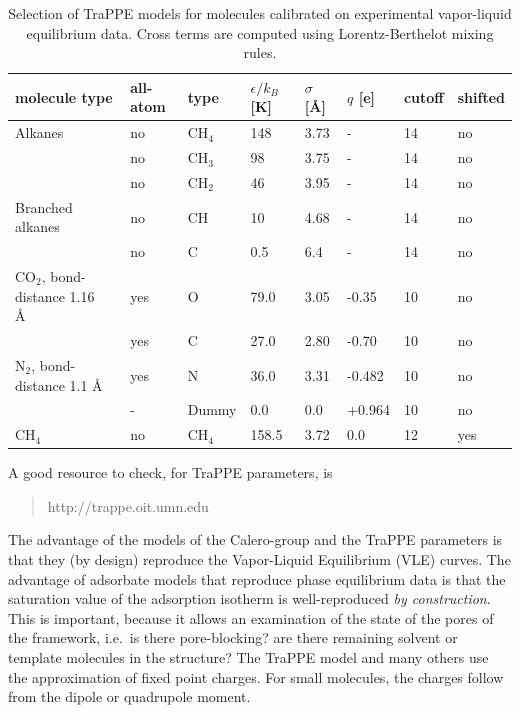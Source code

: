 \begin{table}[H]
\begin{tabular}{p{5.5cm}|p{1.5cm}|p{1.3cm}|p{1.3cm}|p{1.0cm}|p{1.15cm}|p{1.0cm}|p{1.0cm}}
molecule type &  all-atom & type & $\epsilon/k_B$ [K] & $\sigma$ [\AA] & $q$ [e] & cutoff & shifted\\
\hline
\hline
Alkanes \cite{Martin1998} & no  & CH$_4$ & 148 & 3.73 & - & 14 & no\\
                         & no  & CH$_3$ & 98 & 3.75 & - & 14 & no\\
                         & no  & CH$_2$ & 46 & 3.95 & - & 14 & no\\
\hline
Branched alkanes\cite {Martin1999} & no  & CH & 10 & 4.68 & - & 14 & no\\
                                  & no  & C & 0.5 & 6.4 & - & 14 & no\\
\hline
CO$_2$, bond-distance 1.16 \AA\ \cite{Potoff2001} & yes  & O     & 79.0 & 3.05 & -0.35 & 10 & no\\
                                                   & yes  & C     & 27.0 & 2.80 & -0.70 & 10 & no\\
\hline
N$_2$, bond-distance 1.1 \AA\ \cite{Potoff2001} & yes  & N     & 36.0 & 3.31 & -0.482 & 10 & no\\
                                                & -    & Dummy & 0.0 & 0.0 & +0.964 & 10 & no\\
\hline
CH$_4$ \cite{Martin2001} & no  & CH$_4$ & 158.5 & 3.72 & 0.0 & 12 & yes\\
\end{tabular}
\caption{Selection of TraPPE models for molecules calibrated on experimental vapor-liquid equilibrium data.
 Cross terms are computed using Lorentz-Berthelot mixing rules.}
\label{Table: TraPPE VLE calibrated LJ}
\end{table}

\noindent
A good resource to check, for TraPPE parameters, is 
\begin{quote}
http://trappe.oit.umn.edu
\end{quote}
The advantage of the models of the Calero-group and the TraPPE parameters is that they (by design) reproduce the Vapor-Liquid Equilibrium (VLE) curves.
The advantage of adsorbate models that reproduce phase equilibrium data is that the saturation value of the adsorption
isotherm is well-reproduced \emph{by construction}. This is important, because it allows an examination of the
state of the pores of the framework, i.e.\ is there pore-blocking? are there remaining solvent or template molecules in the structure?
The TraPPE model and many others use the approximation of fixed point charges.
For small molecules, the charges follow from the dipole or quadrupole moment.

